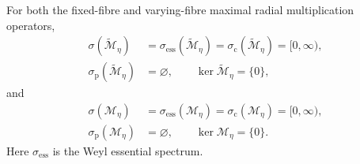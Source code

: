\begin{theorem}
\label{native-di-main-theorem}
For both the fixed-fibre and varying-fibre maximal radial multiplication
operators,
\begin{equation}
\begin{aligned}
 \sigma(\widetilde{\mathscr M}_\eta)
 &=\sigma_{\mathrm{ess}}(\widetilde{\mathscr M}_\eta)
 =\sigma_{\mathrm c}(\widetilde{\mathscr M}_\eta)
 =[0,\infty),\\
 \sigma_{\mathrm p}(\widetilde{\mathscr M}_\eta)
 &=\varnothing,
 \qquad
 \ker\widetilde{\mathscr M}_\eta=\{0\},
\end{aligned}
\label{native-di-fixed-spectrum-result}
\end{equation}
and
\begin{equation}
\begin{aligned}
 \sigma(\mathscr M_\eta)
 &=\sigma_{\mathrm{ess}}(\mathscr M_\eta)
 =\sigma_{\mathrm c}(\mathscr M_\eta)
 =[0,\infty),\\
 \sigma_{\mathrm p}(\mathscr M_\eta)
 &=\varnothing,
 \qquad
 \ker\mathscr M_\eta=\{0\}.
\end{aligned}
\label{native-di-varying-spectrum-result}
\end{equation}
Here \(\sigma_{\mathrm{ess}}\) is the Weyl essential spectrum.
\end{theorem}

